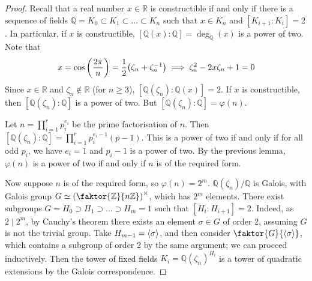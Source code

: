 \begin{proof}
	Recall that a real number \( x \in \mathbb R \) is constructible if and only if there is a sequence of fields \( \mathbb Q = K_0 \subset K_1 \subset \dots \subset K_n \) such that \( x \in K_n \) and \( [K_{i+1} : K_i] = 2 \).
	In particular, if \( x \) is constructible, \( [\mathbb Q(x) : \mathbb Q] = \deg_{\mathbb Q}(x) \) is a power of two.
	Note that
	\[ x = \cos\qty(\frac{2\pi}{n}) = \frac{1}{2} \qty(\zeta_n + \zeta_n^{-1}) \implies \zeta_n^2 - 2x\zeta_n + 1 = 0 \]
	Since \( x \in \mathbb R \) and \( \zeta_n \not\in \mathbb R \) (for \( n \geq 3 \)), \( [\mathbb Q(\zeta_n) : \mathbb Q(x)] = 2 \).
	If \( x \) is constructible, then \( [\mathbb Q(\zeta_n):\mathbb Q] \) is a power of two.
	But \( [\mathbb Q(\zeta_n):\mathbb Q] = \varphi(n) \).

	Let \( n = \prod_{i=1}^r p_i^{e_i} \) be the prime factorisation of \( n \).
	Then \( [\mathbb Q(\zeta_n):\mathbb Q] = \prod_{i=1}^r p_i^{e_i - 1}(p-1) \).
	This is a power of two if and only if for all odd \( p_i \), we have \( e_i = 1 \) and \( p_i - 1 \) is a power of two.
	By the previous lemma, \( \varphi(n) \) is a power of two if and only if \( n \) is of the required form.

	Now suppose \( n \) is of the required form, so \( \varphi(n) = 2^m \).
	\( \mathbb Q(\zeta_n) / \mathbb Q \) is Galois, with Galois group \( G \simeq \qty(\faktor{\mathbb Z}{n\mathbb Z})^\times \), which has \( 2^m \) elements.
	There exist subgroups \( G = H_0 \supset H_1 \supset \dots \supset H_m = 1 \) such that \( [H_i : H_{i+1}] = 2 \).
	Indeed, as \( 2 \mid 2^m \), by Cauchy's theorem there exists an element \( \sigma \in G \) of order 2, assuming \( G \) is not the trivial group.
	Take \( H_{m-1} = \left\langle{} \sigma \right\rangle \), and then consider \( \faktor{G}{\genset{\sigma}} \), which contains a subgroup of order 2 by the same argument; we can proceed inductively.
	Then the tower of fixed fields \( K_i = \mathbb Q(\zeta_n)^{H_i} \) is a tower of quadratic extensions by the Galois correspondence.
\end{proof}

